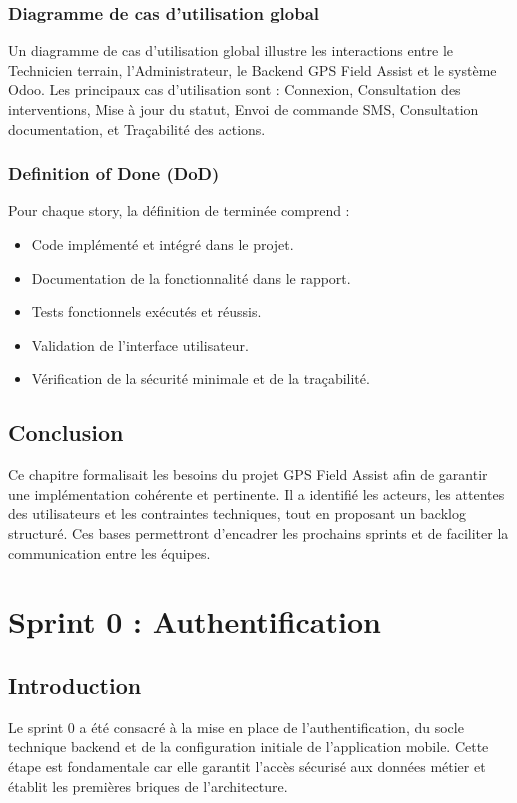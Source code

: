 \documentclass[12pt,a4paper]{report}
\begin{document}
\subsection{Diagramme de cas d'utilisation global}
\noindent Un diagramme de cas d'utilisation global illustre les interactions entre le Technicien terrain, l'Administrateur, le Backend GPS Field Assist et le système Odoo. Les principaux cas d'utilisation sont : Connexion, Consultation des interventions, Mise à jour du statut, Envoi de commande SMS, Consultation documentation, et Traçabilité des actions.

\subsection{Definition of Done (DoD)}
\noindent Pour chaque story, la définition de terminée comprend :
\begin{itemize}
    \item Code implémenté et intégré dans le projet.
    \item Documentation de la fonctionnalité dans le rapport.
    \item Tests fonctionnels exécutés et réussis.
    \item Validation de l'interface utilisateur.
    \item Vérification de la sécurité minimale et de la traçabilité.
\end{itemize}

\section{Conclusion}
\noindent Ce chapitre formalisait les besoins du projet GPS Field Assist afin de garantir une implémentation cohérente et pertinente. Il a identifié les acteurs, les attentes des utilisateurs et les contraintes techniques, tout en proposant un backlog structuré. Ces bases permettront d'encadrer les prochains sprints et de faciliter la communication entre les équipes.

\chapter{Sprint 0 : Authentification}

\section{Introduction}
\noindent Le sprint 0 a été consacré à la mise en place de l'authentification, du socle technique backend et de la configuration initiale de l'application mobile. Cette étape est fondamentale car elle garantit l'accès sécurisé aux données métier et établit les premières briques de l'architecture.
\end{document}
